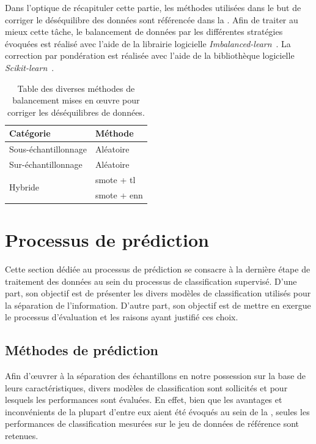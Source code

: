 Dans l'optique de récapituler cette partie, les méthodes utilisées dans le but de corriger le déséquilibre des données sont référencée dans la . Afin de traiter au mieux cette tâche, le balancement de données par les différentes stratégies évoquées est réalisé avec l'aide de la librairie logicielle \textit{Imbalanced-learn}~\cite{Lemaitre2017}. La correction par pondération est réalisée avec l'aide de la bibliothèque logicielle \textit{Scikit-learn}~\cite{pedregosa2011}.\par

\begin{table}[H]
    \centering
    \begin{tabular}{ll}
        \toprule
        \textbf{Catégorie}                  & \textbf{Méthode}          \\ \hline
        Sous-échantillonnage                & Aléatoire                 \\ \hline
        Sur-échantillonnage                 & Aléatoire                 \\ \hline
        \multirow{2}{*}{Hybride}            & \gls{smote} + \gls{tl}    \\ \cline{2-2}
                                            & \gls{smote} + \gls{enn}   \\ \bottomrule
    \end{tabular}
    \caption{Table des diverses méthodes de balancement mises en œuvre pour corriger les déséquilibres de données.}
    \label{tab:summary_balancement_methods}
\end{table}\par

\section{Processus de prédiction}
Cette section dédiée au processus de prédiction se consacre à la dernière étape de traitement des données au sein du processus de classification supervisé. D'une part, son objectif est de présenter les divers modèles de classification utilisés pour la séparation de l'information. D'autre part, son objectif est de mettre en exergue le processus d'évaluation et les raisons ayant justifié ces choix.\par

\subsection{Méthodes de prédiction}
Afin d'œuvrer à la séparation des échantillons en notre possession sur la base de leurs caractéristiques, divers modèles de classification sont sollicités et pour lesquels les performances sont évaluées. En effet, bien que les avantages et inconvénients de la plupart d'entre eux aient été évoqués au sein de la , seules les performances de classification mesurées sur le jeu de données de référence sont retenues.\par

